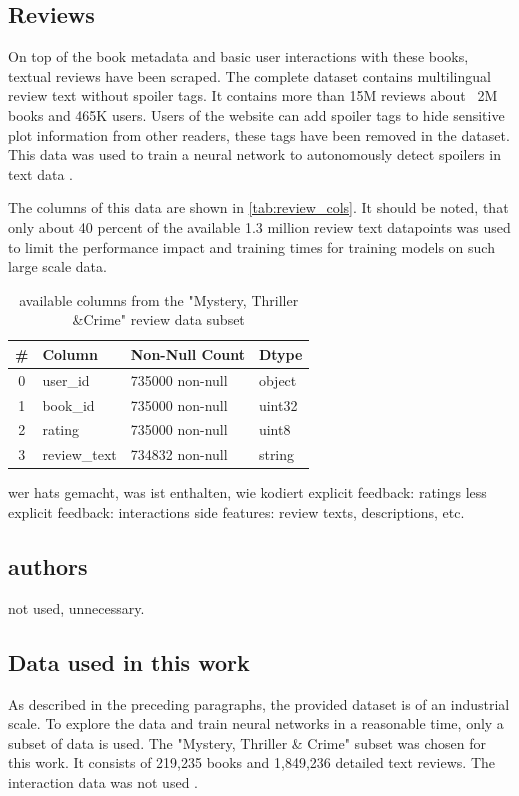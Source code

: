 \documentclass[10pt,final,journal,a4paper,oneside,twocolumn]{IEEEtran}
\begin{document}
\subsection{Reviews}
On top of the book metadata and basic user interactions with these books, textual reviews have been scraped. The complete dataset contains multilingual review text without spoiler tags. It contains more than 15M reviews about ~2M books and 465K users. Users of the website can add spoiler tags to hide sensitive plot information from other readers, these tags have been removed in the dataset. This data was used to train a neural network to autonomously detect spoilers in text data \cite{Wan.2019}.

The columns of this data are shown in \autoref{tab:review_cols}. It should be noted, that only about 40 percent of the available 1.3 million review text datapoints was used to limit the performance impact and training times for training models on such large scale data.
\begin{table}[h]
\begin{center}
        \begin{tabular}{clll}
            \toprule
            \# & Column & Non-Null Count & Dtype \\
            \midrule
            0 & user\_id & 735000 non-null & object \\
            1 & book\_id & 735000 non-null & uint32 \\
            2 & rating & 735000 non-null & uint8 \\
            3 & review\_text & 734832 non-null & string \\
            \bottomrule
            \end{tabular}        
            \caption{available columns from the "Mystery, Thriller \&Crime" review data subset}
            \label{tab:review_cols}
    
\end{center}\end{table}
% 

wer hats gemacht, was ist enthalten, wie kodiert
explicit feedback: ratings
less explicit feedback: interactions
side features: review texts, descriptions, etc.
\subsection{authors}
not used, unnecessary.

\subsection{Data used in this work}
As described in the preceding paragraphs, the provided dataset is of an industrial scale. To explore the data and train neural networks in a reasonable time, only a subset of data is used.
The "Mystery, Thriller \& Crime" subset was chosen for this work. It consists of 219,235 books and 1,849,236 detailed text reviews. The interaction data was not used .
\end{document}
